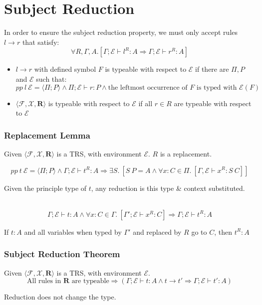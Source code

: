 \section{Subject Reduction}
In order to ensure the subject reduction property, we must only accept rules $l \to r$ that satisfy:
\[\forall R, \Gamma, A . [\Gamma;\mathcal{E} \vdash l^R : A \Rightarrow \Gamma;\mathcal{E} \vdash r^R : A]\]

\begin{itemize}
    \item {$l \to r$ with defined symbol $F$ is typeable with respect to $\mathcal{E}$ if there are $\Pi, P$ and $\mathcal{E}$ such that:
        \[pp \ l \ \mathcal{E} = \langle \Pi ; P \rangle \land \Pi; \mathcal{E} \vdash r : P \land \text{the leftmost occurrence of }F\text{ is typed with }\mathcal{E}(F) \]
    }
    \item $\langle \mathcal{F}, \mathcal{X}, \mathbf{R} \rangle$ is typeable with respect to $\mathcal{E}$ if all $r \in R$ are typeable with respect to $\mathcal{E}$
\end{itemize}

\subsubsection{Replacement Lemma}
Given $\langle \mathcal{F}, \mathcal{X}, \mathbf{R} \rangle$ is a TRS, with environment $\mathcal{E}$. $R$ is a replacement.

\[pp \ t \ \mathcal{E} = \langle \Pi ; P \rangle \land \Gamma; \mathcal{E} \vdash t^R : A \Rightarrow \exists S . \ [S \ P = A \land \forall x:C \in \Pi . \ [\Gamma, \mathcal{E} \vdash x^R : S \ C]]\]
\centerline{Given the principle type of $t$, any reduction is this type \& context substituted.}
\\
\[\Gamma ; \mathcal{E} \vdash t : A \land \forall x:C \in \Gamma . \ [\Gamma';\mathcal{E} \vdash x^R : C] \Rightarrow \Gamma;\mathcal{E} \vdash t^R : A\]
\centerline{If $t : A$ and all variables when typed by $\Gamma'$ and replaced by $R$ go to $C$, then $t^R : A$}

\subsubsection{Subject Reduction Theorem}
Given $\langle \mathcal{F}, \mathcal{X}, \mathbf{R} \rangle$ is a TRS, with environment $\mathcal{E}$.
\[\text{All rules in $\mathbf{R}$ are typeable} \Rightarrow (\Gamma; \mathcal{E} \vdash t : A \land t \to t' \Rightarrow \Gamma;\mathcal{E} \vdash t' : A)\]
\centerline{Reduction does not change the type.}

